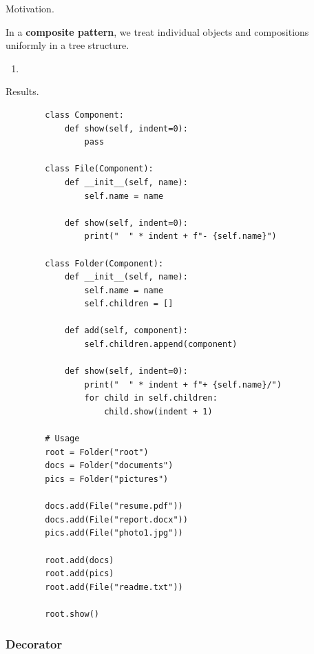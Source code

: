     Motivation. 

    \begin{definition}
      \label{def:composite-pattern}
      In a \textbf{composite pattern}, we treat individual objects and compositions uniformly in a tree structure. 
      \begin{enumerate}
        \item 
      \end{enumerate}
    \end{definition}

    Results. 

    \begin{example}
      \label{ex:case-study-4}
      \begin{lstlisting}
        class Component:
            def show(self, indent=0):
                pass

        class File(Component):
            def __init__(self, name):
                self.name = name
            
            def show(self, indent=0):
                print("  " * indent + f"- {self.name}")

        class Folder(Component):
            def __init__(self, name):
                self.name = name
                self.children = []
            
            def add(self, component):
                self.children.append(component)
            
            def show(self, indent=0):
                print("  " * indent + f"+ {self.name}/")
                for child in self.children:
                    child.show(indent + 1)

        # Usage
        root = Folder("root")
        docs = Folder("documents")
        pics = Folder("pictures")

        docs.add(File("resume.pdf"))
        docs.add(File("report.docx"))
        pics.add(File("photo1.jpg"))

        root.add(docs)
        root.add(pics)
        root.add(File("readme.txt"))

        root.show() 
      \end{lstlisting}
    \end{example}

  \subsubsection{Decorator}

